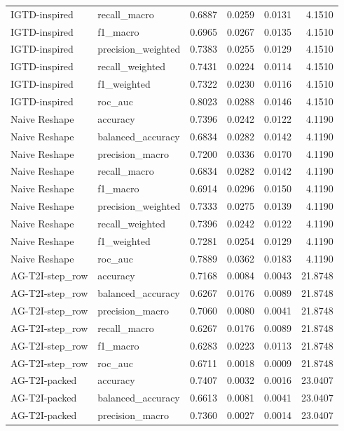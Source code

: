 \begin{tabular}{llrrrr}
IGTD-inspired & recall_macro & 0.6887 & 0.0259 & 0.0131 & 4.1510 \\
IGTD-inspired & f1_macro & 0.6965 & 0.0267 & 0.0135 & 4.1510 \\
IGTD-inspired & precision_weighted & 0.7383 & 0.0255 & 0.0129 & 4.1510 \\
IGTD-inspired & recall_weighted & 0.7431 & 0.0224 & 0.0114 & 4.1510 \\
IGTD-inspired & f1_weighted & 0.7322 & 0.0230 & 0.0116 & 4.1510 \\
IGTD-inspired & roc_auc & 0.8023 & 0.0288 & 0.0146 & 4.1510 \\
Naive Reshape & accuracy & 0.7396 & 0.0242 & 0.0122 & 4.1190 \\
Naive Reshape & balanced_accuracy & 0.6834 & 0.0282 & 0.0142 & 4.1190 \\
Naive Reshape & precision_macro & 0.7200 & 0.0336 & 0.0170 & 4.1190 \\
Naive Reshape & recall_macro & 0.6834 & 0.0282 & 0.0142 & 4.1190 \\
Naive Reshape & f1_macro & 0.6914 & 0.0296 & 0.0150 & 4.1190 \\
Naive Reshape & precision_weighted & 0.7333 & 0.0275 & 0.0139 & 4.1190 \\
Naive Reshape & recall_weighted & 0.7396 & 0.0242 & 0.0122 & 4.1190 \\
Naive Reshape & f1_weighted & 0.7281 & 0.0254 & 0.0129 & 4.1190 \\
Naive Reshape & roc_auc & 0.7889 & 0.0362 & 0.0183 & 4.1190 \\
AG-T2I-step_row & accuracy & 0.7168 & 0.0084 & 0.0043 & 21.8748 \\
AG-T2I-step_row & balanced_accuracy & 0.6267 & 0.0176 & 0.0089 & 21.8748 \\
AG-T2I-step_row & precision_macro & 0.7060 & 0.0080 & 0.0041 & 21.8748 \\
AG-T2I-step_row & recall_macro & 0.6267 & 0.0176 & 0.0089 & 21.8748 \\
AG-T2I-step_row & f1_macro & 0.6283 & 0.0223 & 0.0113 & 21.8748 \\
AG-T2I-step_row & roc_auc & 0.6711 & 0.0018 & 0.0009 & 21.8748 \\
AG-T2I-packed & accuracy & 0.7407 & 0.0032 & 0.0016 & 23.0407 \\
AG-T2I-packed & balanced_accuracy & 0.6613 & 0.0081 & 0.0041 & 23.0407 \\
AG-T2I-packed & precision_macro & 0.7360 & 0.0027 & 0.0014 & 23.0407 \\

\end{tabular}
